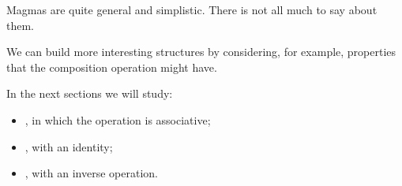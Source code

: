 Magmas are quite general and simplistic.
There is not all much to say about them.

We can build more interesting structures by considering, for example, properties that the composition operation might have.

In the next sections we will study:

\begin{itemize}
    \item \emph{},  in which the operation is associative;
    \item \emph{},  with an identity;
    \item \emph{},  with an inverse operation.
\end{itemize}
